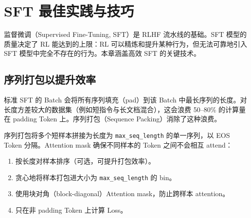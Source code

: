 \chapter{SFT 最佳实践与技巧}
\label{sec:sft-best-practices}

监督微调（Supervised Fine-Tuning, SFT）是 RLHF 流水线的基础。SFT 模型的质量决定了 RL 能达到的上限：RL 可以精炼和提升某种行为，但无法可靠地引入 SFT 模型中完全不存在的行为。本章涵盖高效 SFT 的关键技术。

\section{序列打包以提升效率}
\label{sec:sequence-packing}

\begin{intuitionbox}[Padding 问题]
标准 SFT 的 Batch 会将所有序列填充（pad）到该 Batch 中最长序列的长度。对长度方差较大的数据集（例如短指令与长文档混合），这会浪费 50--80\% 的计算量在 padding Token 上。序列打包（Sequence Packing）消除了这种浪费。
\end{intuitionbox}

序列打包将多个短样本拼接为长度为 \texttt{max\_seq\_length} 的单一序列，以 EOS Token 分隔。Attention mask 确保不同样本的 Token 之间不会相互 attend：

\begin{enumerate}
  \item 按长度对样本排序（可选，可提升打包效率）。
  \item 贪心地将样本打包进大小为 \texttt{max\_seq\_length} 的 bin。
  \item 使用块对角（block-diagonal）Attention mask，防止跨样本 attention。
  \item 只在非 padding Token 上计算 Loss。
\end{enumerate}

